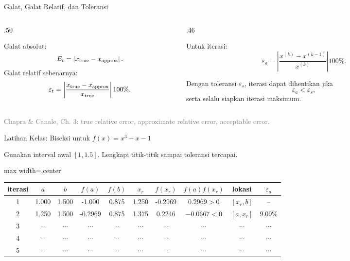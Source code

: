 \documentclass[aspectratio=169,10pt]{beamer}
\newcommand{\smallgray}[1]{\textcolor{GrayText}{\scriptsize #1}}
\begin{document}
\begin{frame}{Galat, Galat Relatif, dan Toleransi}
\scriptsize
\begin{columns}[T,totalwidth=\textwidth]
\begin{column}{.50\textwidth}
\begin{bluebox}
Galat absolut:
\[
E_t=\left|x_{\rm true}-x_{\rm approx}\right|.
\]
Galat relatif sebenarnya:
\[
\varepsilon_t=\left|\frac{x_{\rm true}-x_{\rm approx}}{x_{\rm true}}\right|100\%.
\]
\end{bluebox}
\end{column}
\begin{column}{.46\textwidth}
\begin{orangebox}
Untuk iterasi:
\[
\varepsilon_a=\left|\frac{x^{(k)}-x^{(k-1)}}{x^{(k)}}\right|100\%.
\]
\end{orangebox}
\begin{goldbox}
Dengan toleransi \(\varepsilon_s\), iterasi dapat dihentikan jika
\[
\varepsilon_a<\varepsilon_s,
\]
serta selalu siapkan iterasi maksimum.
\end{goldbox}
\end{column}
\end{columns}
\vfill
\smallgray{Chapra \& Canale, Ch. 3: true relative error, approximate relative error, acceptable error.}
\end{frame}

\begin{frame}{Latihan Kelas: Biseksi untuk $f(x)=x^3-x-1$}
\tiny
\begin{bluebox}[Aktivitas]
Gunakan interval awal \([1,1.5]\). Lengkapi titik-titik sampai toleransi tercapai.
\end{bluebox}
\renewcommand{\arraystretch}{1.08}
\begin{adjustbox}{max width=\linewidth,center}
\begin{tabular}{c c c c c c c c c c}
\toprule
iterasi & $a$ & $b$ & $f(a)$ & $f(b)$ & $x_r$ & $f(x_r)$ & $f(a)f(x_r)$ & lokasi & $\varepsilon_a$\\
\midrule
1 & 1.000 & 1.500 & -1.000 & 0.875 & 1.250 & -0.2969 & $0.2969>0$ & $[x_r,b]$ & --\\
2 & 1.250 & 1.500 & -0.2969 & 0.875 & 1.375 & 0.2246 & $-0.0667<0$ & $[a,x_r]$ & 9.09\%\\
3 & $\cdots$ & $\cdots$ & $\cdots$ & $\cdots$ & $\cdots$ & $\cdots$ & $\cdots$ & $\cdots$ & $\cdots$\\
4 & $\cdots$ & $\cdots$ & $\cdots$ & $\cdots$ & $\cdots$ & $\cdots$ & $\cdots$ & $\cdots$ & $\cdots$\\
5 & $\cdots$ & $\cdots$ & $\cdots$ & $\cdots$ & $\cdots$ & $\cdots$ & $\cdots$ & $\cdots$ & $\cdots$\\
\bottomrule
\end{tabular}
\end{adjustbox}
\end{frame}
\end{document}
